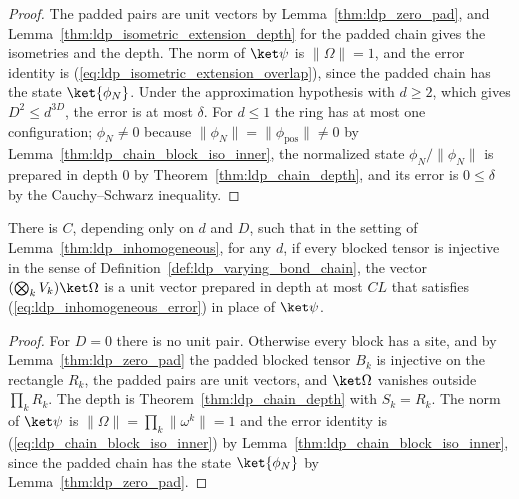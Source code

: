 \begin{proof}
    \leanok
    The padded pairs are unit vectors by Lemma~\ref{thm:ldp_zero_pad}, and
    Lemma~\ref{thm:ldp_isometric_extension_depth} for the padded chain gives
    the isometries and the depth. The norm of $\ket\psi$ is
    $\lVert\Omega\rVert=1$, and the error identity is
    (\ref{eq:ldp_isometric_extension_overlap}), since the padded chain has the
    state $\ket{\phi_N}$. Under the approximation hypothesis with $d\ge2$, which
    gives $D^2\le d^{3D}$, the error is at most $\delta$. For $d\le1$ the ring
    has at most one configuration; $\phi_N\ne0$ because
    $\lVert\phi_N\rVert=\lVert\phi_{\mathrm{pos}}\rVert\ne0$ by
    Lemma~\ref{thm:ldp_chain_block_iso_inner}, the normalized
    state $\phi_N/\lVert\phi_N\rVert$ is prepared in depth $0$ by
    Theorem~\ref{thm:ldp_chain_depth}, and its error is $0\le\delta$ by the
    Cauchy--Schwarz inequality.
\end{proof}

\begin{corollary}
    \label{cor:ldp_inhomogeneous_injective}
    \leanok
    There is $C$, depending only on $d$ and $D$, such that in the setting of
    Lemma~\ref{thm:ldp_inhomogeneous}, for any $d$, if every blocked
    tensor is injective in the sense of
    Definition~\ref{def:ldp_varying_bond_chain}, the vector
    $(\bigotimes_kV_k)\ket\Omega$ is a unit vector prepared in depth at most
    $CL$ that satisfies (\ref{eq:ldp_inhomogeneous_error}) in place of
    $\ket\psi$.
\end{corollary}
\begin{proof}
    \leanok
    For $D=0$ there is no unit pair. Otherwise every block has a site, and by
    Lemma~\ref{thm:ldp_zero_pad} the padded blocked tensor $B_k$ is
    injective on the rectangle $R_k$, the padded pairs are unit vectors, and
    $\ket\Omega$ vanishes outside $\prod_kR_k$. The depth is
    Theorem~\ref{thm:ldp_chain_depth} with $S_k=R_k$. The norm of $\ket\psi$ is
    $\lVert\Omega\rVert=\prod_k\lVert\omega^k\rVert=1$ and the error identity is
    (\ref{eq:ldp_chain_block_iso_inner}) by
    Lemma~\ref{thm:ldp_chain_block_iso_inner}, since the padded chain has the
    state $\ket{\phi_N}$ by Lemma~\ref{thm:ldp_zero_pad}.
\end{proof}


